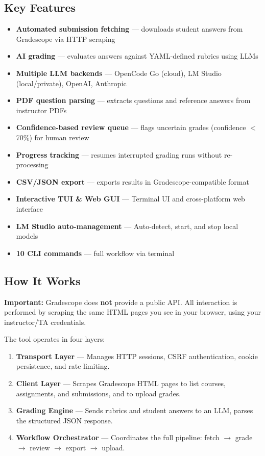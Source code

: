 \documentclass[11pt,a4paper]{article}
\begin{document}
\subsection{Key Features}

\begin{itemize}[itemsep=3pt]
    \item \textbf{Automated submission fetching} — downloads student answers from Gradescope via HTTP scraping
    \item \textbf{AI grading} — evaluates answers against YAML-defined rubrics using LLMs
    \item \textbf{Multiple LLM backends} — OpenCode Go (cloud), LM Studio (local/private), OpenAI, Anthropic
    \item \textbf{PDF question parsing} — extracts questions and reference answers from instructor PDFs
    \item \textbf{Confidence-based review queue} — flags uncertain grades (confidence $<$ 70\%) for human review
    \item \textbf{Progress tracking} — resumes interrupted grading runs without re-processing
    \item \textbf{CSV/JSON export} — exports results in Gradescope-compatible format
    \item \textbf{Interactive TUI \& Web GUI} — Terminal UI and cross-platform web interface
    \item \textbf{LM Studio auto-management} — Auto-detect, start, and stop local models
    \item \textbf{10 CLI commands} — full workflow via terminal
\end{itemize}

\subsection{How It Works}

\begin{infobox}
\textbf{Important:} Gradescope does \textbf{not} provide a public API. All interaction is performed by scraping the same HTML pages you see in your browser, using your instructor/TA credentials.
\end{infobox}

The tool operates in four layers:

\begin{enumerate}[itemsep=3pt]
    \item \textbf{Transport Layer} — Manages HTTP sessions, CSRF authentication, cookie persistence, and rate limiting.
    \item \textbf{Client Layer} — Scrapes Gradescope HTML pages to list courses, assignments, and submissions, and to upload grades.
    \item \textbf{Grading Engine} — Sends rubrics and student answers to an LLM, parses the structured JSON response.
    \item \textbf{Workflow Orchestrator} — Coordinates the full pipeline: fetch $\rightarrow$ grade $\rightarrow$ review $\rightarrow$ export $\rightarrow$ upload.
\end{enumerate}
\end{document}

